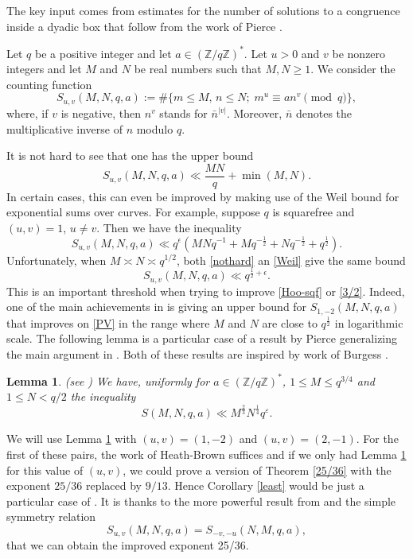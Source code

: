 \documentclass[a4paper, 11pt]{amsart}
\theoremstyle{plain}
\newtheorem{lem}[thm]{Lemma}
\theoremstyle{definition}
\newcommand{\Z}{\mathbb{Z}}
\begin{document}
The key input comes from estimates for the number of solutions to a congruence inside a dyadic box that follow from the work of Pierce \citep{pierce2005part}.

Let $q$ be a positive integer and let $a\in (\Z/q\Z)^{\ast}$. Let $u>0$ and $v$ be nonzero integers and let $M$ and $N$ be real numbers such that $M, N \geq 1$. We consider the counting function
%
$$
S_{u,v}(M,N,q,a) := \#\{m\leq M,\,n\leq N;\;m^u \equiv an^v\pmod q\},
$$
where, if $v$ is negative, then $n^{v}$ stands for ${\bar n}^{|v|}$. Moreover, $\bar n$ denotes the multiplicative inverse of $n$ modulo $q$.

It is not hard to see that one has the upper bound
\begin{equation}\label{nothard}
S_{u,v}(M,N,q,a)\ll \frac{MN}{q} +\min(M,N).
\end{equation}
%
In certain cases, this can even be improved by making use of the Weil bound for exponential sums over curves. For example, suppose $q$ is squarefree and $(u,v)=1$, $u\neq v$. Then we have the inequality
%
\begin{equation}\label{Weil}
S_{u,v}(M,N,q,a)\ll q^{\epsilon}\left( MNq^{-1} + Mq^{-\frac12} + Nq^{-\frac12} + q^{\frac12}\right).
\end{equation}
%
Unfortunately, when $M \asymp N \asymp q^{1/2}$, both \eqref{nothard} an \eqref{Weil} give the same bound
%
\begin{equation}\label{PV}
S_{u,v}(M,N,q,a)\ll q^{\frac12+\epsilon}.
\end{equation}
%
This is an important threshold when trying to improve \eqref{Hoo-sqf} or \eqref{3/2}. Indeed, one of the main achievements in \citep{heath1982least} is giving an upper bound for $S_{1,-2}(M,N,q,a)$ that improves on \eqref{PV} in the range where $M$ and $N$ are close to $q^{\frac12}$ in logarithmic scale.
%
The following lemma is a particular case of a result by Pierce \citep{pierce2005part} generalizing the main argument in \citep{heath1982least}. Both of these results are inspired by work of Burgess \citep{burgess1962characters}.
%
\begin{lem}\label{Pierce} (see \citep[Theorem 4]{pierce2005part})
We have, uniformly for $a\in (\Z/q\Z)^{\ast}$, $1\leq M\leq q^{3/4}$ and $1\leq N < q/2$ the inequality
%
$$
S(M,N,q,a)\ll M^{\frac{2}{3}}N^{\frac{1}{4}}q^{\varepsilon}.
$$
\end{lem}

We will use Lemma \ref{Pierce} with $(u,v)=(1,-2)$ and $(u,v)=(2,-1)$. For the first of these pairs, the work of Heath-Brown suffices and if we only had Lemma \ref{Pierce} for this value of $(u,v)$, we could prove a version of Theorem \ref{25/36} with the exponent $25/36$ replaced by $9/13$. Hence Corollary \ref{least} would be just a particular case of \citep[Theorem 2]{heath1982least}. It is thanks to the more powerful result from \citep{pierce2005part} and the simple symmetry relation
%
\begin{equation}\label{symmetry}
S_{u,v}(M,N,q,a) = S_{-v,-u}(N,M,q,a),
\end{equation}
that we can obtain the improved exponent 25/36.
\end{document}
